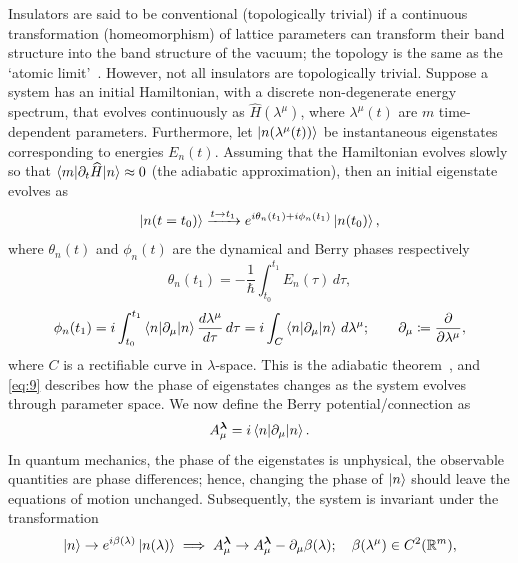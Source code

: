 \documentclass[11pt, a4paper]{article}
\begin{document}
Insulators are said to be conventional (topologically trivial) if a
continuous transformation (homeomorphism) of lattice parameters can
transform their band structure into the band structure of the vacuum;
the topology is the same as the `atomic limit'~\cite{TopIns}. However, not all 
insulators are topologically trivial.
Suppose a system has an initial Hamiltonian, with a discrete non-degenerate 
energy spectrum, that evolves
continuously as $\widehat{H}(\lambda^\mu)$, where $\lambda^\mu(t)$ are $m$
time-dependent parameters.
Furthermore, let $\ket{n(\lambda^\mu(t))}$ be instantaneous eigenstates 
corresponding to energies $E_n(t)$. Assuming that the Hamiltonian evolves slowly 
so that $\braket{m|\partial_t \widehat{H}|n} \approx 0$ (the adiabatic approximation),
then an initial eigenstate evolves as
\begin{equation}
  \ket{n(t = t_0)} \xrightarrow{t \rightarrow t_1} e^{i \theta_n(t_1) +i \phi_n(t_1)}\ket{n(t_0)},
\end{equation}
where $\theta_n(t)$ and $\phi_n(t)$ are the dynamical and Berry phases respectively
\begin{equation}
\theta_n(t_1) = -\frac{1}{\hbar}\int_{t_0}^{t_1}{E_n(\tau)\,d\tau},
\end{equation}
\begin{equation}\label{eq:9}
  \phi_n(t_1) = i\int_{t_0}^{t_1}{\braket{n |\partial_{\mu}| n}
  \frac{d\lambda^\mu}{d\tau} \,d\tau}
  = i\int_C{ \braket{n |\partial_\mu| n}\,d\lambda^\mu };
  \qquad \partial_\mu \coloneq \frac{\partial}{\partial \lambda^\mu},
\end{equation}
where $C$ is a rectifiable curve in $\lambda$-space.
This is the adiabatic theorem~\cite{AdiabaticThrm,Berry},
and \eqref{eq:9} describes how the phase of eigenstates changes as
the system evolves through parameter space.
We now define the Berry potential/connection as
\begin{equation}
  A_\mu^{\bm{\lambda}} =  i \braket{n |\partial_\mu| n}.
\end{equation}
In quantum mechanics, the phase of the eigenstates is unphysical,
the observable quantities are phase differences;
hence, changing the phase of $\ket{n}$ should leave the equations of motion unchanged.
Subsequently, the system is invariant under the transformation
\begin{equation}
  \ket{n} \rightarrow e^{i\beta(\lambda)}\ket{n(\lambda)}
  \implies A_\mu^{\bm{\lambda}} \rightarrow A_\mu^{\bm{\lambda}} - \partial_\mu \beta(\lambda);
  \quad \beta(\lambda^\mu) \in C^2(\mathbb{R}^m),
\end{equation}
\end{document}
